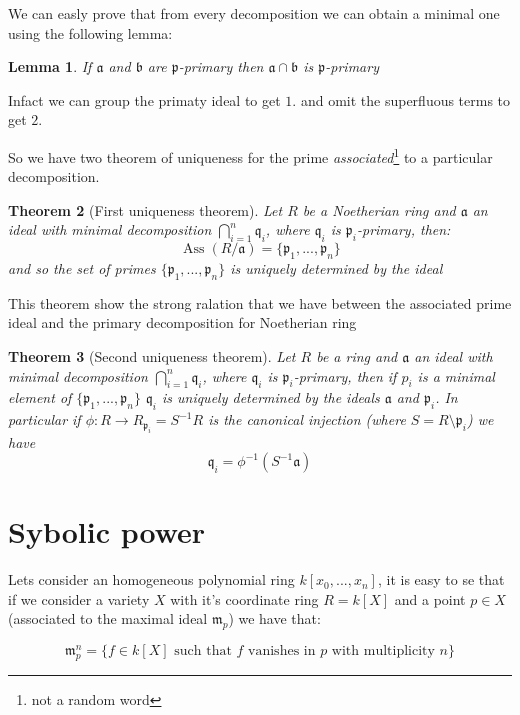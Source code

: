 \documentclass[]{book}
\theoremstyle{plain}
\newtheorem{teo}{Theorem}[section]
\newtheorem{lem}[teo]{Lemma}
\theoremstyle{remark}
\theoremstyle{definition}
\newcommand{\p}{\mathfrak{p}}
\newcommand{\q}{\mathfrak{q}}
\newcommand{\mm}{\mathfrak{m}}
\newcommand{\A}{\mathfrak{a}}
\newcommand{\B}{\mathfrak{b}}
\DeclareMathOperator{\Ass}{Ass}
\begin{document}
We can easly prove that from every decomposition we can obtain a minimal one using the following lemma:

\begin{lem}
If $ \A $ and $ \B $ are $ \p $-primary then $ \A \cap \B $ is $ \p $-primary
\end{lem}

Infact we can group the primaty ideal to get $ 1. $ and omit the superfluous terms to get $ 2. $

So we have two theorem of uniqueness for the prime \textit{associated}\footnote{not a random word} to a particular decomposition. 

\begin{teo}[First uniqueness theorem]
Let $ R $ be a Noetherian ring and $ \A $ an ideal with minimal decomposition $ \bigcap_{i=1}^n \q_i $, where $ \q_i $ is $ \p_i $-primary, then:
\[ \Ass(R/ \A) = \{ \p_1 , ... , \p_n \} \]
and so the set of primes $ \{ \p_1 , ... , \p_n \} $ is uniquely determined by the ideal

\end{teo}

This theorem show the strong ralation that we have between the associated prime ideal and the primary decomposition for Noetherian ring

\begin{teo}[Second uniqueness theorem]
Let $ R $ be a ring and $ \A $ an ideal with minimal decomposition $ \bigcap_{i=1}^n \q_i $, where $ \q_i $ is $ \p_i $-primary, then if $ p_i $ is a minimal element of $ \{ \p_1 , ... , \p_n \} $ $ \q_i $ is uniquely determined by the ideals $ \A $ and $ \p_i $.
In particular if $ \phi : R \to R_{\p_i} = S^{-1} R$ is the canonical injection (where $ S = R \setminus \p_i $) we have
\[ 
\q_i = \phi ^{-1} ( S^{-1} \A  )
\]

\end{teo}


\section{Sybolic power}

	Lets consider an homogeneous polynomial ring $ k[x_0 , ... , x_n] $, it is easy to se that if we consider a variety $ X $ with it's coordinate ring $ R = k[X] $ and a point $ p \in X $ (associated to the maximal ideal $ \mm_p $)  we have that:
	
	\begin{equation}\label{eq:max_pow}
		\mm_p^n = \{ f \in k[X] \text{ such that } f \text{ vanishes in } p \text{ with multiplicity } n\}
	\end{equation}
	
\end{document}
